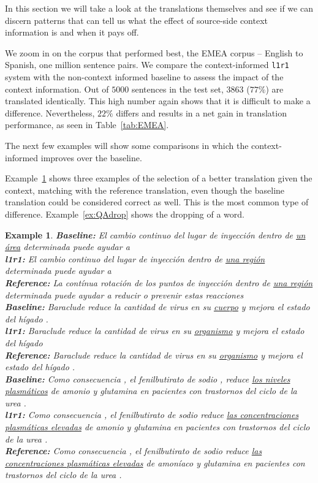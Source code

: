 \documentclass[smallextended]{svjour3}       %
\theoremstyle{break}
\newtheorem{exmp}{Example}[section]
\begin{document}
In this section we will take a look at the translations themselves and see if
we can discern patterns that can tell us what the effect of source-side context
information is and when it pays off.

We zoom in on the corpus that performed best, the EMEA corpus -- English to
Spanish, one million sentence pairs. We compare the context-informed
\texttt{l1r1} system with the non-context informed baseline to assess the
impact of the context information. Out of $5000$ sentences in the test set,
$3863$ ($77\%$) are translated identically. This high number again shows that
it is difficult to make a difference. Nevertheless, $22\%$ differs and results
in a net gain in translation performance, as seen in Table~\ref{tab:EMEA}.

The next few examples will show some comparisons in which the context-informed
improves over the baseline. 

Example~\ref{ex:QAsynonym} shows three examples of the selection of a better
translation given the context, matching with the reference translation, even
though the baseline translation could be considered correct as well. This is
the most common type of difference. Example~\ref{ex:QAdrop} shows the dropping
of a word.


\begin{exmp}
\footnotesize
\label{ex:QAsynonym}
\textbf{Baseline:} El cambio continuo del lugar de inyección dentro de \underline{un área} determinada puede ayudar a \\
\textbf{l1r1:} El cambio continuo del lugar de inyección dentro de \underline{una región} determinada puede ayudar a \\
\textbf{Reference:} La contínua rotación de los puntos de inyección dentro de \underline{una región} determinada puede ayudar a reducir o prevenir estas reacciones \\
\noindent\makebox[\linewidth]{\rule{\linewidth}{0.4pt}}
\textbf{Baseline:} Baraclude reduce la cantidad de virus en su \underline{cuerpo} y mejora el estado del hígado . \\
\textbf{l1r1:} Baraclude reduce la cantidad de virus en su \underline{organismo} y mejora el estado del hígado  \\
\textbf{Reference:} Baraclude reduce la cantidad de virus en su \underline{organismo} y mejora el estado del hígado .
\\ 
\noindent\makebox[\linewidth]{\rule{\linewidth}{0.4pt}}
\textbf{Baseline:} Como consecuencia , el fenilbutirato de sodio , reduce \underline{los niveles plasmáticos} de amonio y glutamina en pacientes con trastornos del ciclo de la urea . \\
\textbf{l1r1:} Como consecuencia , el fenilbutirato de sodio reduce \underline{las concentraciones plasmáticas elevadas} de amonio y glutamina en pacientes con trastornos del ciclo de la urea .  \\
\textbf{Reference:} Como consecuencia , el fenilbutirato de sodio reduce \underline{las concentraciones plasmáticas elevadas} de amoníaco y glutamina en pacientes con trastornos del ciclo de la urea .
\end{exmp}
\end{document}
